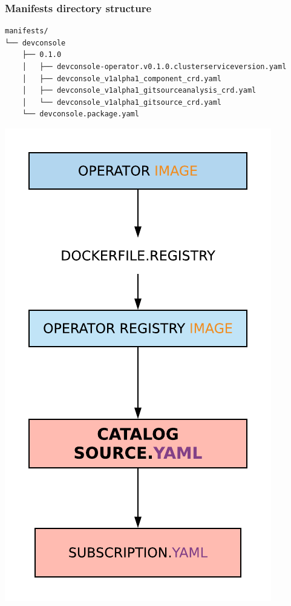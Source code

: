 \documentclass[aspectratio=169]{beamer}
\begin{document}
\begin{frame}[fragile]
  \frametitle{Manifests directory structure}

  \begin{Verbatim}[fontsize=\small]
manifests/
└── devconsole
    ├── 0.1.0
    │   ├── devconsole-operator.v0.1.0.clusterserviceversion.yaml
    │   ├── devconsole_v1alpha1_component_crd.yaml
    │   ├── devconsole_v1alpha1_gitsourceanalysis_crd.yaml
    │   └── devconsole_v1alpha1_gitsource_crd.yaml
    └── devconsole.package.yaml
  \end{Verbatim}

\end{frame}

\begin{frame}
  \begin{center}
    \includegraphics[scale=.50]{images/catalog.png}
  \end{center}
\end{frame}
\end{document}
